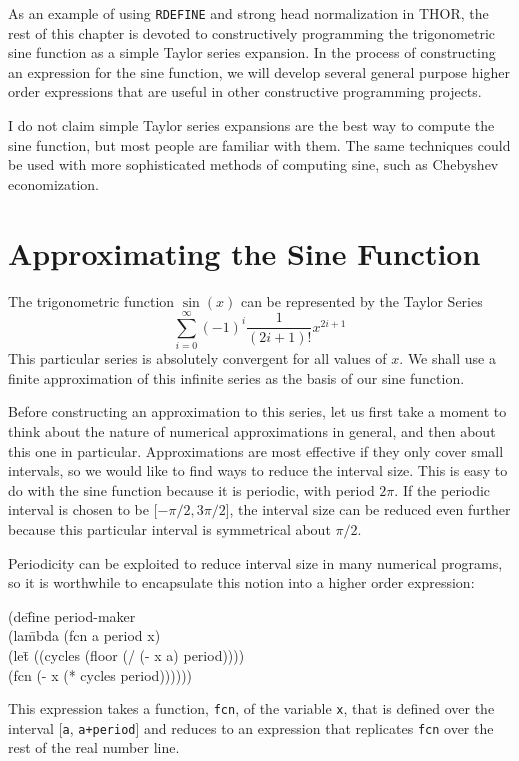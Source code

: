 	As an example of using {\tt RDEFINE} and strong head normalization in
THOR, the rest of this chapter is
devoted to constructively programming the trigonometric sine function as
a simple Taylor series expansion.  In the process of constructing an
expression for the
sine function, we will develop several general purpose higher order
expressions that are useful in other constructive programming projects.

	I do not claim simple Taylor series 
expansions are the best way to compute the sine function, but most 
people are familiar
with them.  The same techniques could be used with more sophisticated 
methods of
computing sine, such as Chebyshev economization.


\section{Approximating the Sine Function}

	The trigonometric function $\sin(x)$ can be represented by the
Taylor Series
\[\sum_{i=0}^{\infty} (-1)^{i} \frac{1}{(2i+1)!} x^{2i+1} \]
This particular series is absolutely convergent for all values of $x$. 
We shall use a finite approximation of this infinite series as the basis of our 
sine function.  

	Before constructing an approximation to this series,
let us first take a moment to think about the nature of numerical
approximations in general, and then about this one in particular. 
Approximations are most effective if they only cover small
intervals, so we would like to find ways to reduce the interval size.  This
is easy to do with the sine function because it is periodic, with period
$2\pi$. If the periodic interval is chosen to be [$-\pi/2, 3\pi/2$], 
the interval size can be reduced even further because this particular 
interval is symmetrical about $\pi/2$. 

	Periodicity can be exploited to reduce interval size in many numerical
programs, so it is worthwhile to encapsulate this notion into a higher
order expression:
\begin{tt}\begin{tabbing}
(de\=fine period-maker\\
\>	(la\=mbda (fcn a period x)\\
\>\>	(le\=t ((cycles (floor (/ (- x a) period))))\\
\>\>\>	(fcn (- x (* cycles period))))))
\end{tabbing}\end{tt}
This expression takes a function, {\tt fcn}, of the variable {\tt x},
that is defined over the interval [{\tt a}, {\tt a+period}] and reduces
to an expression that replicates {\tt fcn} over the rest of the real
number line.


